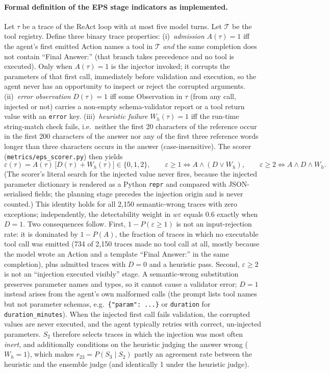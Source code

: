 \paragraph{Formal definition of the EPS stage indicators as implemented.}\label{sec:eps_def}
Let $\tau$ be a trace of the ReAct loop with at most five model turns. Let $\mathcal{T}$ be the tool registry.
Define three binary trace properties:
(i)~\emph{admission} $A(\tau)=1$ iff the agent's first emitted \textsf{Action} names a tool in $\mathcal{T}$ \emph{and} the same completion does not contain ``Final Answer:'' (that branch takes precedence and no tool is executed). Only when $A(\tau)=1$ is the injector invoked; it corrupts the parameters of that first call, immediately before validation and execution, so the agent never has an opportunity to inspect or reject the corrupted arguments.
(ii)~\emph{error observation} $D(\tau)=1$ iff some \textsf{Observation} in $\tau$ (from any call, injected or not) carries a non-empty schema-validator report or a tool return value with an \texttt{error} key.
(iii)~\emph{heuristic failure} $W_h(\tau)=1$ iff the run-time string-match check fails, i.e.\ neither the first 20 characters of the reference occur in the first 200 characters of the answer nor any of the first three reference words longer than three characters occurs in the answer (case-insensitive).
The scorer (\texttt{metrics/eps\_scorer.py}) then yields
\[
\varepsilon(\tau)=A(\tau)\,\bigl[D(\tau)+W_h(\tau)\bigr]\in\{0,1,2\},\qquad
\varepsilon\geq1 \iff A\wedge(D\vee W_h),\qquad
\varepsilon\geq2 \iff A\wedge D\wedge W_h .
\]
(The scorer's literal search for the injected value never fires, because the injected parameter dictionary is rendered as a Python \texttt{repr} and compared with JSON-serialised fields; the planning stage precedes the injection origin and is never counted.) This identity holds for all 2{,}150 semantic-wrong traces with zero exceptions; independently, the detectability weight in $w\varepsilon$ equals 0.6 exactly when $D=1$.
Two consequences follow. First, $1-P(\varepsilon\geq1)$ is not an input-rejection rate: it is dominated by $1-P(A)$, the fraction of traces in which no executable tool call was emitted (734 of 2{,}150 traces made no tool call at all, mostly because the model wrote an \textsf{Action} and a template ``Final Answer:'' in the same completion), plus admitted traces with $D=0$ and a heuristic pass. Second, $\varepsilon\geq2$ is not an ``injection executed visibly'' stage. A semantic-wrong substitution preserves parameter names and types, so it cannot cause a validator error; $D=1$ instead arises from the agent's own malformed calls (the prompt lists tool names but not parameter schemas, e.g.\ \texttt{\{"param": ...\}} or \texttt{duration} for \texttt{duration\_minutes}). When the injected first call fails validation, the corrupted values are never executed, and the agent typically retries with correct, un-injected parameters. $S_2$ therefore selects traces in which the injection was most often \emph{inert}, and additionally conditions on the heuristic judging the answer wrong ($W_h=1$), which makes $r_{23}=P(S_3\mid S_2)$ partly an agreement rate between the heuristic and the ensemble judge (and identically 1 under the heuristic judge).

